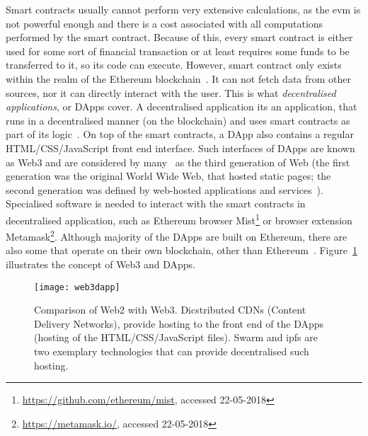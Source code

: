 Smart contracts usually cannot perform very extensive calculations, as the \acrshort{evm} is not powerful enough and there is a cost associated with all computations performed by the smart contract. Because of this, every smart contract is either used for some sort of financial transaction or at least requires some funds to be transferred to it, so its code can execute. However, smart contract only exists within the realm of the Ethereum blockchain~\cite{JohnWeldon2016BuildingContract}. It can not fetch data from other sources, nor it can directly interact with the user. This is what \textit{decentralised applications}, or DApps cover. A decentralised application its an application, that runs in a decentralised manner (on the blockchain) and uses smart contracts as part of its logic~\cite[p. 149]{Dannen2017IntroducingSolidity}. On top of the smart contracts, a DApp also contains a regular HTML/CSS/JavaScript front end interface. Such interfaces of DApps are known as Web3 and are considered by many~\cite{Dannen2017IntroducingSolidity, LukeHedger2017CrossingDevelopment} as the third generation of Web (the first generation was the original World Wide Web, that hosted static pages; the second generation was defined by web-hosted applications and services~\cite{Dannen2017IntroducingSolidity}). Specialised software is needed to interact with the smart contracts in decentralised application, such as Ethereum browser Mist\footnote{\url{https://github.com/ethereum/mist}, accessed 22-05-2018} or browser extension Metamask\footnote{\url{https://metamask.io/}, accessed 22-05-2018}. Although majority of the DApps are built on Ethereum, there are also some that operate on their own blockchain, other than Ethereum~\cite{AlyssaHertigWhatCoinDesk}. Figure~\ref{fig:web3} illustrates the concept of Web3 and DApps.

\begin{figure}
    \centering
    \texttt{[image: web3dapp]}
    \caption{Comparison of Web2 with Web3. Dicstributed CDNs (Content Delivery Networks), provide hosting to the front end of the DApps (hosting of the HTML/CSS/JavaScript files). Swarm and \acrfull{ipfs} are two exemplary technologies that can provide decentralised such hosting.}
    \label{fig:web3}
\end{figure}